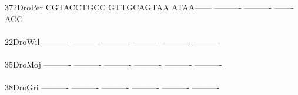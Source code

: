 \documentclass[11pt,twoside,reqno,a4paper]{article}
\begin{document}
{372\hspace*{2\charwidth}DroPer	CGTACCTGCC	GTTGCAGTAA	ATAA------	----------	----------	-------ACC	\\
\hspace*{5\charwidth}\hspace*{7\charwidth}\hspace*{1\charwidth}\hspace*{1\charwidth}\hspace*{1\charwidth}\hspace*{1\charwidth}\hspace*{1\charwidth}\hspace*{1\charwidth}\\
22\hspace*{3\charwidth}DroWil	----------	----------	----------	----------	----------	----------	\\
\hspace*{5\charwidth}\hspace*{7\charwidth}\hspace*{1\charwidth}\hspace*{1\charwidth}\hspace*{1\charwidth}\hspace*{1\charwidth}\hspace*{1\charwidth}\hspace*{1\charwidth}\\
35\hspace*{3\charwidth}DroMoj	----------	----------	----------	----------	----------	----------	\\
\hspace*{5\charwidth}\hspace*{7\charwidth}\hspace*{1\charwidth}\hspace*{1\charwidth}\hspace*{1\charwidth}\hspace*{1\charwidth}\hspace*{1\charwidth}\hspace*{1\charwidth}\\
38\hspace*{3\charwidth}DroGri	----------	----------	----------	----------	----------	----------	\\
\hspace*{5\charwidth}\hspace*{7\charwidth}\hspace*{1\charwidth}\hspace*{1\charwidth}\hspace*{1\charwidth}\hspace*{1\charwidth}\hspace*{1\charwidth}\hspace*{1\charwidth}\\
}
\end{document}
